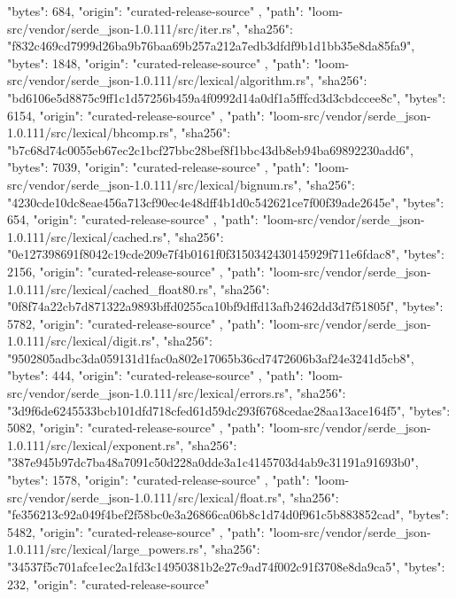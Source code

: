 {{      "bytes": 684,
      "origin": "curated-release-source"
    },
    {
      "path": "loom-src/vendor/serde_json-1.0.111/src/iter.rs",
      "sha256": "f832c469cd7999d26ba9b76baa69b257a212a7edb3dfdf9b1d1bb35e8da85fa9",
      "bytes": 1848,
      "origin": "curated-release-source"
    },
    {
      "path": "loom-src/vendor/serde_json-1.0.111/src/lexical/algorithm.rs",
      "sha256": "bd6106e5d8875c9ff1c1d57256b459a4f0992d14a0df1a5fffcd3d3cbdccee8c",
      "bytes": 6154,
      "origin": "curated-release-source"
    },
    {
      "path": "loom-src/vendor/serde_json-1.0.111/src/lexical/bhcomp.rs",
      "sha256": "b7c68d74c0055eb67ec2c1bcf27bbc28bef8f1bbc43db8eb94ba69892230add6",
      "bytes": 7039,
      "origin": "curated-release-source"
    },
    {
      "path": "loom-src/vendor/serde_json-1.0.111/src/lexical/bignum.rs",
      "sha256": "4230cde10dc8eae456a713cf90ec4e48dff4b1d0c542621ce7f00f39ade2645e",
      "bytes": 654,
      "origin": "curated-release-source"
    },
    {
      "path": "loom-src/vendor/serde_json-1.0.111/src/lexical/cached.rs",
      "sha256": "0e127398691f8042c19cde209e7f4b0161f0f3150342430145929f711e6fdac8",
      "bytes": 2156,
      "origin": "curated-release-source"
    },
    {
      "path": "loom-src/vendor/serde_json-1.0.111/src/lexical/cached_float80.rs",
      "sha256": "0f8f74a22cb7d871322a9893bffd0255ca10bf9dffd13afb2462dd3d7f51805f",
      "bytes": 5782,
      "origin": "curated-release-source"
    },
    {
      "path": "loom-src/vendor/serde_json-1.0.111/src/lexical/digit.rs",
      "sha256": "9502805adbc3da059131d1fac0a802e17065b36cd7472606b3af24e3241d5cb8",
      "bytes": 444,
      "origin": "curated-release-source"
    },
    {
      "path": "loom-src/vendor/serde_json-1.0.111/src/lexical/errors.rs",
      "sha256": "3d9f6de6245533bcb101dfd718cfed61d59dc293f6768cedae28aa13ace164f5",
      "bytes": 5082,
      "origin": "curated-release-source"
    },
    {
      "path": "loom-src/vendor/serde_json-1.0.111/src/lexical/exponent.rs",
      "sha256": "387e945b97dc7ba48a7091c50d228a0dde3a1c4145703d4ab9c31191a91693b0",
      "bytes": 1578,
      "origin": "curated-release-source"
    },
    {
      "path": "loom-src/vendor/serde_json-1.0.111/src/lexical/float.rs",
      "sha256": "fe356213c92a049f4bef2f58bc0e3a26866ca06b8c1d74d0f961c5b883852cad",
      "bytes": 5482,
      "origin": "curated-release-source"
    },
    {
      "path": "loom-src/vendor/serde_json-1.0.111/src/lexical/large_powers.rs",
      "sha256": "34537f5c701afce1ec2a1fd3c14950381b2e27c9ad74f002c91f3708e8da9ca5",
      "bytes": 232,
      "origin": "curated-release-source"
}}
